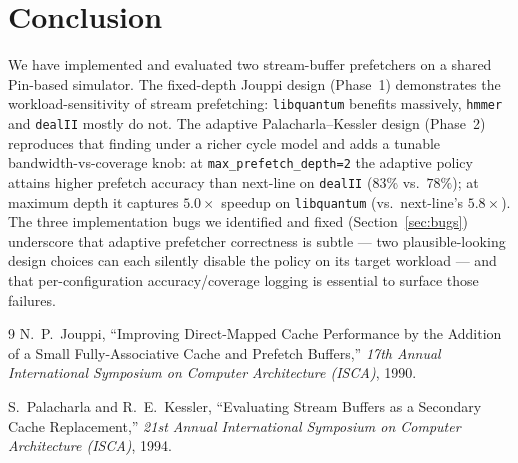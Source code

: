 \documentclass[11pt,letterpaper]{article}
\begin{document}
\section{Conclusion}
We have implemented and evaluated two stream-buffer prefetchers on a
shared Pin-based simulator. The fixed-depth Jouppi design (Phase~1)
demonstrates the workload-sensitivity of stream prefetching:
\texttt{libquantum} benefits massively, \texttt{hmmer} and
\texttt{dealII} mostly do not. The adaptive Palacharla--Kessler design
(Phase~2) reproduces that finding under a richer cycle model and adds a
tunable bandwidth-vs-coverage knob: at \texttt{max\_prefetch\_depth=2}
the adaptive policy attains higher prefetch accuracy than next-line on
\texttt{dealII} ($83\%$ vs.\ $78\%$); at maximum depth it captures
$5.0\times$ speedup on \texttt{libquantum} (vs.\ next-line's $5.8\times$).
The three implementation bugs we identified and fixed
(Section~\ref{sec:bugs}) underscore that adaptive prefetcher correctness
is subtle --- two plausible-looking design choices can each silently
disable the policy on its target workload --- and that per-configuration
accuracy/coverage logging is essential to surface those failures.

\begin{thebibliography}{9}
N.~P.~Jouppi, ``Improving Direct-Mapped Cache Performance by the Addition
of a Small Fully-Associative Cache and Prefetch Buffers,''
\textit{17th Annual International Symposium on Computer Architecture (ISCA)},
1990.

S.~Palacharla and R.~E.~Kessler, ``Evaluating Stream Buffers as a Secondary
Cache Replacement,''
\textit{21st Annual International Symposium on Computer Architecture (ISCA)},
1994.
\end{thebibliography}
\end{document}
